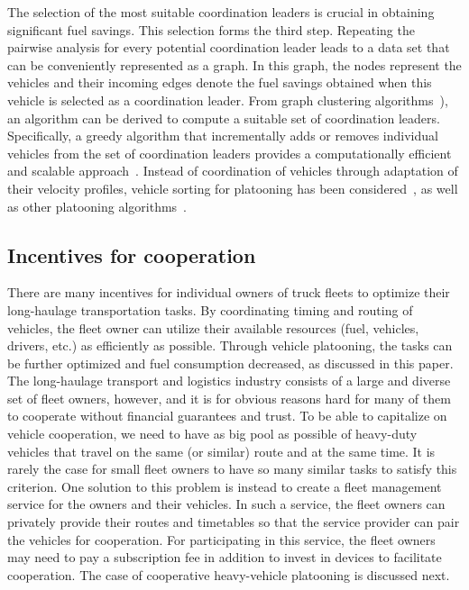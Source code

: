 \documentclass[journal]{IEEEtran}
\begin{document}
The selection of the most suitable coordination leaders is crucial in obtaining significant fuel savings. This selection forms the third step. Repeating the pairwise analysis for every potential coordination leader leads to a data set that can be conveniently represented as a graph. In this graph, the nodes represent the vehicles and their incoming edges denote the fuel savings obtained when this vehicle is selected as a coordination leader.
From graph clustering algorithms~\cite{pam_book}), an algorithm can be derived to compute a suitable set of coordination leaders. Specifically, a greedy algorithm that incrementally adds or removes individual vehicles from the set of coordination leaders provides a computationally efficient and scalable
approach~\cite{vandehoef_2015}. Instead of coordination of vehicles through adaptation of their velocity profiles, vehicle sorting for platooning has been considered~\cite{Hall_platoon_sorting}, as well as other platooning algorithms~\cite{datamining_platooning}.


\subsection{Incentives for cooperation}
There are many incentives for individual owners of truck fleets to optimize their long-haulage transportation tasks. By coordinating timing and routing of vehicles, the fleet owner can utilize their available resources (fuel, vehicles, drivers, etc.) as efficiently as possible. Through vehicle platooning, the tasks can be further optimized and fuel consumption decreased, as discussed in this paper. The long-haulage transport and logistics industry consists of a large and diverse set of fleet owners, however, and it is for obvious reasons hard for many of them to cooperate without financial guarantees and trust. To be able to capitalize on vehicle cooperation, we need to have as big pool as possible of heavy-duty vehicles that travel on the same (or similar) route and at the same time. It is rarely the case for small fleet owners to have so many similar tasks to satisfy this criterion. One solution to this problem is instead to create a fleet management service for the owners and their vehicles. In such a service, the fleet owners can privately provide their routes and timetables so that the service provider can pair the vehicles for cooperation. For participating in this service, the fleet owners may need to pay a subscription fee in addition to invest in devices to facilitate cooperation. The case of cooperative heavy-vehicle platooning is discussed next.
\end{document}

